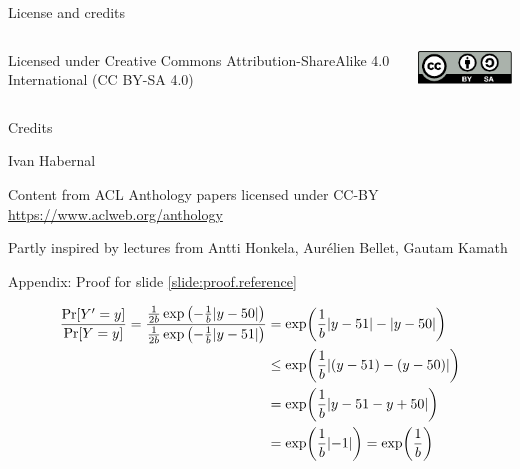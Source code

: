 \documentclass[12pt,aspectratio=169,handout]{beamer}
\begin{document}
\begin{frame}{License and credits}

	\begin{columns}
		\begin{column}{0.7\textwidth}
			Licensed under Creative Commons Attribution-ShareAlike 4.0 International (CC BY-SA 4.0)
		\end{column}
		\begin{column}{0.2\textwidth}
			\includegraphics[width=0.9\linewidth]{img/cc-by-sa-icon.pdf}
		\end{column}
	\end{columns}
	
	\bigskip
	
	Credits
	
	\begin{scriptsize}
		
		Ivan Habernal
		
		Content from ACL Anthology papers licensed under CC-BY \url{https://www.aclweb.org/anthology}
		
		Partly inspired by lectures from Antti Honkela, Aurélien Bellet, Gautam Kamath
	
	\end{scriptsize}
	
\end{frame}



\begin{frame}{Appendix: Proof for slide \ref{slide:proof.reference}}

$$
\begin{aligned}
\frac{\Pr[Y' = y]}{\Pr[Y = y]} =
\frac{
\frac{1}{2b} \exp \left(- \frac{1}{b} \abs{y - 50} \right)
}{
\frac{1}{2b} \exp \left(- \frac{1}{b} \abs{y - 51} \right)
}
&= \exp (\frac{1}{b} \abs{y - 51} - \abs{y - 50} ) \\
&\leq \exp (\frac{1}{b} \abs{(y - 51) - (y - 50)} ) \\
&= \exp (\frac{1}{b} \abs{y - 51 - y + 50} ) \\
&= \exp (\frac{1}{b} \abs{-1}) = \exp(\frac{1}{b}) \\
\end{aligned}
$$

\end{frame}
\end{document}

